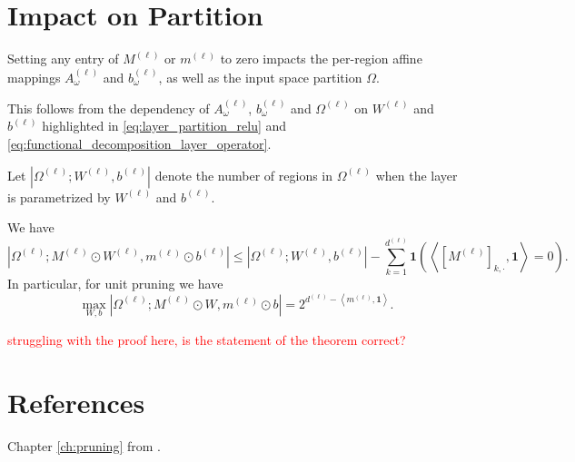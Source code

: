 \section{Impact on Partition}

\begin{proposition}
    Setting any entry of $M^{(\ell)}$ or $m^{(\ell)}$ to zero impacts the per-region affine mappings $A^{(\ell)}_{\omega}$ and $b^{(\ell)}_{\omega}$, as well as the input space partition $\Omega$.
\end{proposition}

\begin{tproof}
    This follows from the dependency of $A^{(\ell)}_{\omega}$, $b^{(\ell)}_{\omega}$ and $\Omega^{(\ell)}$ on $W^{(\ell)}$ and $b^{(\ell)}$ highlighted in \eqref{eq:layer_partition_relu} and \eqref{eq:functional_decomposition_layer_operator}.
\end{tproof}

Let $\left\vert\Omega^{(\ell)};W^{(\ell)},b^{(\ell)}\right\vert$ denote the number of regions in $\Omega^{(\ell)}$ when the layer is parametrized by $W^{(\ell)}$ and $b^{(\ell)}$.

\begin{theorem}
    We have $$\left\vert\Omega^{(\ell)};M^{(\ell)}\odot W^{(\ell)},m^{(\ell)}\odot b^{(\ell)}\right\vert\leq\left\vert\Omega^{(\ell)};W^{(\ell)},b^{(\ell)}\right\vert-\sum_{k=1}^{d^{(\ell)}}\mathbf{1}\left(\left\langle\left[M^{(\ell)}\right]_{k,\cdot},\mathbf{1}\right\rangle=0\right).$$In particular, for unit pruning we have $$\max_{W,b}\left\vert\Omega^{(\ell)};M^{(\ell)}\odot W,m^{(\ell)}\odot b\right\vert=2^{d^{(\ell)}-\left\langle m^{(\ell)},\mathbf{1}\right\rangle}.$$
\end{theorem}

\begin{tproof}
    \textcolor{Red}{struggling with the proof here, is the statement of the theorem correct?}
\end{tproof}

\section{References}

Chapter \ref{ch:pruning} from \cite{you2022maxaffine}.